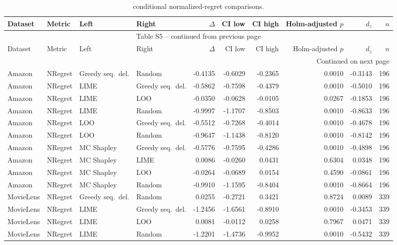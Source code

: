 \begin{longtable}{@{}p{}p{}p{}p{}rrrrrr@{}}
\caption{conditional normalized-regret comparisons.}\label{tab:S5}\\
\toprule
Dataset & Metric & Left & Right & $\Delta$ & CI low & CI high & Holm-adjusted $p$ & $d_z$ & $n$ \\
\midrule
\endfirsthead
\multicolumn{10}{c}{Table S5 -- continued from previous page}\\
\toprule
Dataset & Metric & Left & Right & $\Delta$ & CI low & CI high & Holm-adjusted $p$ & $d_z$ & $n$ \\
\midrule
\endhead
\midrule
\multicolumn{10}{r}{Continued on next page}\\
\endfoot
\bottomrule
\endlastfoot
Amazon & NRegret & Greedy seq.\ del. & Random & -0.4135 & -0.6029 & -0.2365 & 0.0010 & -0.3143 & 196 \\
Amazon & NRegret & LIME & Greedy seq.\ del. & -0.5862 & -0.7598 & -0.4379 & 0.0010 & -0.5010 & 196 \\
Amazon & NRegret & LIME & LOO & -0.0350 & -0.0628 & -0.0105 & 0.0267 & -0.1853 & 196 \\
Amazon & NRegret & LIME & Random & -0.9997 & -1.1707 & -0.8503 & 0.0010 & -0.8633 & 196 \\
Amazon & NRegret & LOO & Greedy seq.\ del. & -0.5512 & -0.7268 & -0.4014 & 0.0010 & -0.4678 & 196 \\
Amazon & NRegret & LOO & Random & -0.9647 & -1.1438 & -0.8120 & 0.0010 & -0.8142 & 196 \\
Amazon & NRegret & MC Shapley & Greedy seq.\ del. & -0.5776 & -0.7595 & -0.4286 & 0.0010 & -0.4898 & 196 \\
Amazon & NRegret & MC Shapley & LIME & 0.0086 & -0.0260 & 0.0431 & 0.6304 & 0.0348 & 196 \\
Amazon & NRegret & MC Shapley & LOO & -0.0264 & -0.0689 & 0.0154 & 0.4590 & -0.0861 & 196 \\
Amazon & NRegret & MC Shapley & Random & -0.9910 & -1.1595 & -0.8404 & 0.0010 & -0.8664 & 196 \\
MovieLens & NRegret & Greedy seq.\ del. & Random & 0.0255 & -0.2721 & 0.3421 & 0.8724 & 0.0089 & 339 \\
MovieLens & NRegret & LIME & Greedy seq.\ del. & -1.2456 & -1.6561 & -0.8910 & 0.0010 & -0.3453 & 339 \\
MovieLens & NRegret & LIME & LOO & 0.0081 & -0.0112 & 0.0258 & 0.7967 & 0.0471 & 339 \\
MovieLens & NRegret & LIME & Random & -1.2201 & -1.4736 & -0.9952 & 0.0010 & -0.5432 & 339 \\

\end{longtable}
